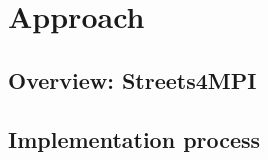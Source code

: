 \chapter{Approach}
\label{chap:Approach}

\section{Overview: Streets4MPI}
\label{sec:Approach::Overview_Streets4MPI}

\section{Implementation process}
\label{sec:Approach::Implementation_process}
